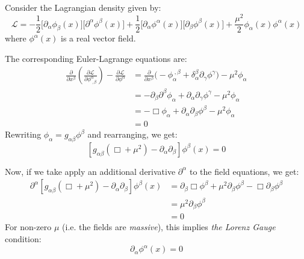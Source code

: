 \documentclass[letterpaper,12pt]{article}
\newenvironment{problem}{\subsection{}\begin{adjustwidth}{0.25in}{}\vspace{-\baselineskip}}{\end{adjustwidth}}
\newcommand{\pder}[2]{\frac{\partial #1}{\partial #2}}
\newcommand{\lagr}{\mathscr{L}}
\DeclareMathOperator{\dalem}{\Box}
\begin{document}
\begin{problem}
Consider the Lagrangian density given by:
\begin{equation*}
	\lagr = -\frac{1}{2}\big[\partial_\alpha\phi_\beta(x)\big]\big[\partial^\alpha\phi^\beta(x)\big] +
	\frac{1}{2}\big[\partial_\alpha\phi^\alpha(x)\big]\big[\partial_\beta\phi^\beta(x)\big] +
	\frac{\mu^2}{2}\phi_\alpha(x)\phi^\alpha(x)
\end{equation*}
where $\phi^\alpha(x)$ is a real vector field.

The corresponding Euler-Lagrange equations are:
\begin{align*}
	\pder{}{x^\beta}\left(\pder{\lagr}{\phi^\alpha_{\;,\beta}}\right) - \pder{\lagr}{\phi^\alpha}
	&= \pder{}{x^\beta}\Big(-\phi_\alpha^{\;,\beta} + \delta^\beta_\alpha \partial_\gamma\phi^\gamma\Big) - \mu^2\phi_\alpha	\\
	&= -\partial_\beta \partial^\beta \phi_\alpha + \partial_\alpha \partial_\gamma \phi^\gamma - \mu^2\phi_\alpha	\\
	&= -\dalem\phi_\alpha + \partial_\alpha\partial_\beta \phi^\beta - \mu^2\phi_\alpha	\\
	&= 0
\end{align*}
Rewriting $\phi_\alpha = g_{\alpha\beta} \phi^\beta$ and rearranging, we get:
\begin{equation*}
	\left[g_{\alpha\beta}\left(\dalem +\mu^2\right) - \partial_\alpha\partial_\beta\right]\phi^\beta(x) = 0		 
\end{equation*}

Now, if we take apply an additional derivative $\partial^\alpha$ to the field equations, we get:
\begin{align*}
	\partial^\alpha\left[g_{\alpha\beta}\left(\dalem+\mu^2\right) - \partial_\alpha\partial_\beta\right]\phi^\beta(x)
	&= \partial_\beta \dalem \phi^\beta + \mu^2 \partial_\beta\phi^\beta - \dalem \partial_\beta \phi^\beta	\\
	&= \mu^2 \partial_\beta \phi^\beta	\\
	&= 0
\end{align*}
For non-zero $\mu$ (i.e. the fields are \emph{massive}), this implies \emph{the Lorenz Gauge} condition:
\begin{equation*}
	\partial_\alpha \phi^\alpha (x) = 0			 
\end{equation*}
\end{problem}
\end{document}
